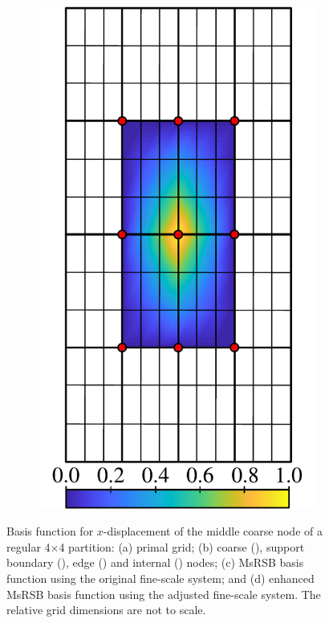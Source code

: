 \begin{figure} [htbp]
\begin{subfigure}[t]{0.22\textwidth}
  \centerline{\includegraphics[width=\linewidth]{figs/MsRSB/FE_12x12_d}}
  \caption{\label{fig:fem_demo_alter}}
\end{subfigure}
\caption[MsRSB basis functions for FEM linear elasticity]{\label{fig:fem_demo} Basis function for $x$-displacement of the middle coarse node of a regular 4$\times$4 partition: (a) primal grid; (b) coarse (), support boundary (), edge () and internal () nodes; (c) MsRSB basis function using the original fine-scale system; and (d) enhanced MsRSB basis function using the adjusted fine-scale system. The relative grid dimensions are not to scale.}
\end{figure}

